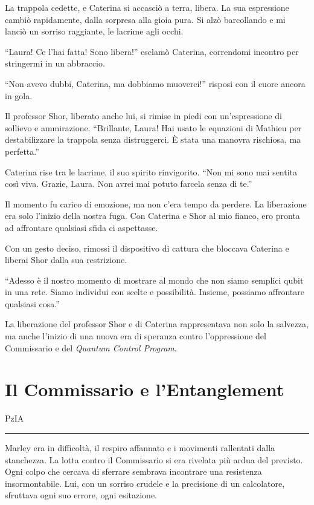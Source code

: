 La trappola cedette, e Caterina si accasciò a terra, libera. La sua espressione cambiò rapidamente, dalla sorpresa alla gioia pura. Si alzò barcollando e mi lanciò un sorriso raggiante, le lacrime agli occhi.


\enquote{Laura! Ce l’hai fatta! Sono libera!} esclamò Caterina, correndomi incontro per stringermi in un abbraccio.

\enquote{Non avevo dubbi, Caterina, ma dobbiamo muoverci!} risposi con il cuore ancora in gola.


Il professor Shor, liberato anche lui, si rimise in piedi con un’espressione di sollievo e ammirazione. \enquote{Brillante, Laura! Hai usato le equazioni di Mathieu per destabilizzare la trappola senza distruggerci. È stata una manovra rischiosa, ma perfetta.}

Caterina rise tra le lacrime, il suo spirito rinvigorito. \enquote{Non mi sono mai sentita così viva. Grazie, Laura. Non avrei mai potuto farcela senza di te.}

Il momento fu carico di emozione, ma non c’era tempo da perdere. La liberazione era solo l’inizio della nostra fuga. Con Caterina e Shor al mio fianco, ero pronta ad affrontare qualsiasi sfida ci aspettasse.



Con un gesto deciso, rimossi il dispositivo di cattura che bloccava Caterina e liberai Shor dalla sua restrizione.

\begin{dialogue}
 \enquote{Adesso è il nostro momento di mostrare al mondo che non siamo semplici qubit in una rete. Siamo individui con scelte e possibilità. Insieme, possiamo affrontare qualsiasi cosa.}
\end{dialogue}

La liberazione del professor Shor e di Caterina rappresentava non solo la salvezza, ma anche l'inizio di una nuova era di speranza contro l'oppressione del Commissario e del \textit{Quantum Control Program}.

\section{Il Commissario e l'Entanglement}
\vspace{1em}
\begin{center}PzIA\end{center}
\hrule
\vspace{1em}

Marley era in difficoltà, il respiro affannato e i movimenti rallentati dalla stanchezza. La lotta contro il Commissario si era rivelata più ardua del previsto. Ogni colpo che cercava di sferrare sembrava incontrare una resistenza insormontabile. Lui, con un sorriso crudele e la precisione di un calcolatore, sfruttava ogni suo errore, ogni esitazione.


